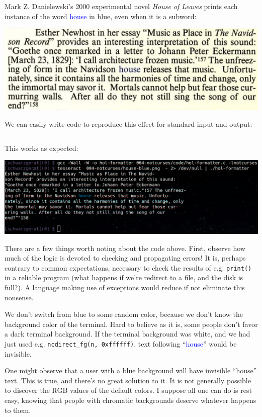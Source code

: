 \documentclass[letterpaper,10pt]{article}
\begin{document}
Mark Z. Danielewski's 2000 experimental novel \textit{House of Leaves} prints each 
instance of the word \textcolor{blue}{house} in blue, even when it is a subword:

\begin{center}
\includegraphics[width=.5\linewidth]{house-blue.png}
\end{center}

We can easily write code to reproduce this effect for standard input and output:

\begin{listing}[ht]
\inputminted[fontsize=\scriptsize]{C}{code/hol-formatter.c}
\end{listing}

This works as expected:

\begin{center}
\includegraphics[width=.75\linewidth]{hol-formatted.png}
\end{center}

There are a few things worth noting about the code above. First, observe how
much of the logic is devoted to checking and propagating errors! It is, perhaps
contrary to common expectations, necessary to check the results of e.g.
\texttt{print()} in a reliable program (what happens if we're redirect to a file, and
the disk is full?). A language making use of exceptions would reduce if not
eliminate this nonsense.

We don't switch from blue to some random color, because we don't know the
background color of the terminal. Hard to believe as it is, some people don't
favor a dark terminal background. If the terminal background was white, and we
had just used e.g. \texttt{ncdirect\_fg(n, 0xffffff)}, text following
``\textcolor{blue}{house}'' would be invisible.

One might observe that a user with a blue background will have invisible ``house'' text.
This is true, and there's no great solution to it. It is not generally possible to
discover the RGB values of the default colors. I suppose all one can do is rest easy,
knowing that people with chromatic backgrounds deserve whatever happens to them.
\end{document}
